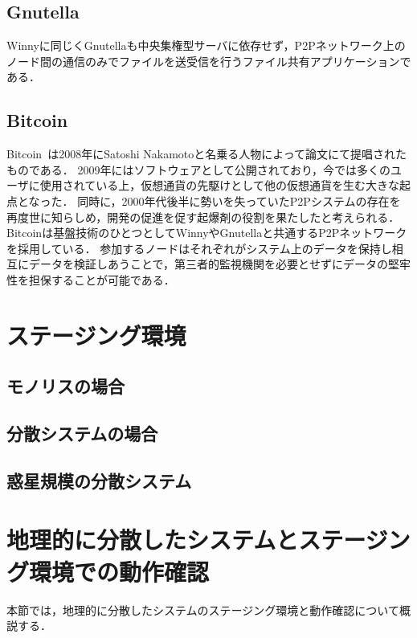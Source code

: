 \subsection{Gnutella}

Winnyに同じくGnutellaも中央集権型サーバに依存せず，P2Pネットワーク上のノード間の通信のみでファイルを送受信を行うファイル共有アプリケーションである．

\subsection{Bitcoin}

Bitcoin~\cite{Bitcoin}は2008年にSatoshi Nakamotoと名乗る人物によって論文にて提唱されたものである．
2009年にはソフトウェアとして公開されており，今では多くのユーザに使用されている上，仮想通貨の先駆けとして他の仮想通貨を生む大きな起点となった．
同時に，2000年代後半に勢いを失っていたP2Pシステムの存在を再度世に知らしめ，開発の促進を促す起爆剤の役割を果たしたと考えられる．
Bitcoinは基盤技術のひとつとしてWinnyやGnutellaと共通するP2Pネットワークを採用している．
参加するノードはそれぞれがシステム上のデータを保持し相互にデータを検証しあうことで，第三者的監視機関を必要とせずにデータの堅牢性を担保することが可能である．

\section{ステージング環境}

\subsection{モノリスの場合}

\subsection{分散システムの場合}

\subsection{惑星規模の分散システム}

\section{地理的に分散したシステムとステージング環境での動作確認}
\label{background:staging-environment}
本節では，地理的に分散したシステムのステージング環境と動作確認について概説する．

